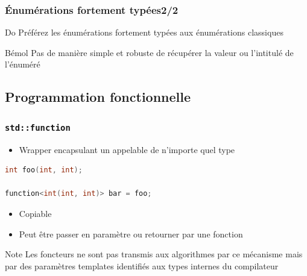 \documentclass[C++.tex]{subfiles}
\begin{document}
\begin{frame}[fragile]
	\frametitle{Énumérations fortement typées\titlehfill{}2/2}
	\begin{exampleblock}{Do}
		Préférez les énumérations fortement typées aux énumérations classiques
	\end{exampleblock}

	\begin{block}{Bémol}
		Pas de manière simple et robuste de récupérer la valeur ou l'intitulé de l'énuméré

	\end{block}
\end{frame}

\subsection*{Programmation fonctionnelle}
\begin{frame}[fragile]
	\frametitle{\lstinline|std::function|}

	\begin{itemize}
		\item Wrapper encapsulant un appelable de n'importe quel type
	\end{itemize}

	\begin{lstlisting}[language=C++]
int foo(int, int);

function<int(int, int)> bar = foo;\end{lstlisting}

	\begin{itemize}
		\item Copiable
		\item Peut être passer en paramètre ou retourner par une fonction
	\end{itemize}

	\begin{block}{Note}
		Les foncteurs ne sont pas transmis aux algorithmes par ce mécanisme mais par des paramètres templates identifiés aux types internes du compilateur
	
	\end{block}
\end{frame}
\end{document}

